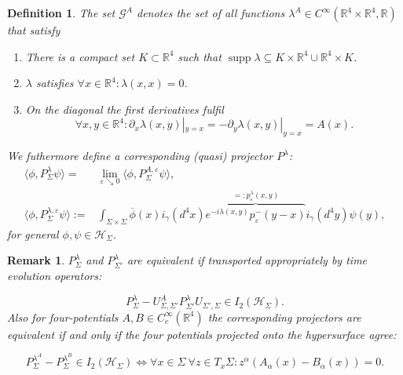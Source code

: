 \documentclass[a4paper,11pt]{article}
\newtheorem{de}{Definition}
\newtheorem{rmk}{Remark}
\newcommand{\supp}{\operatorname{supp}}
\begin{document}
\begin{de}\label{def:lambda}
The set \(\mathcal{G}^A\) denotes the set of all functions \(\lambda^A \in C^\infty (\mathbb{R}^4\times \mathbb{R}^4, \mathbb{R})\) that satisfy
\begin{enumerate}[label= \roman*) ]
\item There is a compact set \(K\subset \mathbb{R}^4\) such that \(\supp \lambda \subseteq K\times \mathbb{R}^4 \cup \mathbb{R}^4 \times K\).
\item \(\lambda\) satisfies \(\forall x \in \mathbb{R}^4: \lambda(x,x)=0\).
\item On the diagonal the first derivatives fulfil 
\begin{equation}
\forall x,y\in\mathbb{R}^4: \partial_x \lambda(x,y)|_{y=x}=-\partial_y \lambda(x,y)|_{y=x} = A(x).
\end{equation}
\end{enumerate}
We futhermore define a corresponding (quasi) projector \(P^\lambda\):
\begin{align}
\langle \phi, P^\lambda_\Sigma \psi\rangle =& \lim_{\varepsilon \searrow 0} \langle \phi, P^{A,\varepsilon}_\Sigma \psi\rangle ,\\\label{def:p lambda}
\langle \phi, P^{\lambda,\varepsilon}_\Sigma \psi\rangle :=&
\int_{\Sigma\times\Sigma}\overline{\phi}(x)i_\gamma(d^4x) 
\overbrace{e^{-i \lambda(x,y)} p^-_\varepsilon(y-x)}^{=:p^\lambda_\varepsilon(x,y)}i_\gamma(d^4y) \psi(y),
\end{align}
for general \(\phi, \psi \in \mathcal{H}_\Sigma\).
\end{de}

\begin{rmk}\label{main results of ivp2}
\(P_{\Sigma}^\lambda\) and \( P_{\Sigma'}^\lambda\) are equivalent if transported appropriately by time evolution operators\cite[theorem 2.8]{ivp2}:

\begin{equation}
P_{\Sigma}^\lambda-U_{\Sigma,\Sigma'}^A P_{\Sigma'}^\lambda U_{\Sigma',\Sigma}\in I_2(\mathcal{H}_\Sigma).
\end{equation}
Also for four-potentials \(A,B\in C_c^\infty(\mathbb{R}^4)\) 
the corresponding projectors are equivalent if and only if the four potentials projected onto the hypersurface agree\cite[theorem 1.5]{ivp2}:

\begin{equation}\label{equiv:pLambda}
P_{\Sigma}^{\lambda^A} - P_{\Sigma}^{\lambda^B} \in I_2(\mathcal{H}_\Sigma) \iff \forall x\in \Sigma~ \forall z\in T_x \Sigma: z^\alpha(A_\alpha(x)-B_\alpha(x))=0.
\end{equation}
\end{rmk}
\end{document}
